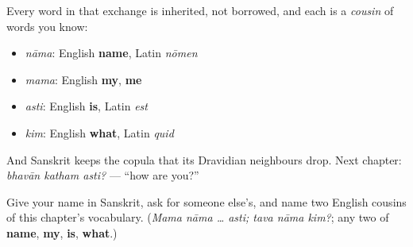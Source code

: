 \begin{grammarlens}[title={What you've built: every atom is a source}]
Every word in that exchange is inherited, not borrowed, and each is a \emph{cousin} of words you know:

\begin{itemize}
\raggedright
  \item \emph{nāma}: English \textbf{name}, Latin \emph{nōmen}
  \item \emph{mama}: English \textbf{my}, \textbf{me}
  \item \emph{asti}: English \textbf{is}, Latin \emph{est}
  \item \emph{kim}: English \textbf{what}, Latin \emph{quid}
\end{itemize}

And Sanskrit keeps the copula that its Dravidian neighbours drop. Next chapter: \emph{bhavān katham asti?} — \textquotedblleft{}how are you?\textquotedblright{}
\end{grammarlens}

\begin{tcolorbox}[breakable,colback=teal!4,colframe=teal!35!black,title={Before you move on}]
Give your name in Sanskrit, ask for someone else's, and name two English cousins of this chapter's vocabulary. (\emph{Mama nāma … asti; tava nāma kim?}; any two of \textbf{name}, \textbf{my}, \textbf{is}, \textbf{what}.)
\end{tcolorbox}
